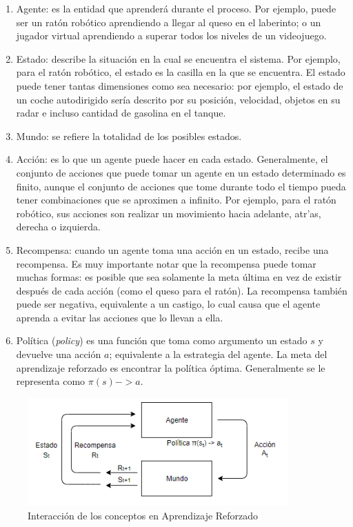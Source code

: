 \begin{enumerate}
    \item Agente: es la entidad que aprender\'a durante el proceso. Por ejemplo, puede ser un rat\'on rob\'otico aprendiendo a llegar al queso en el laberinto; o un jugador virtual aprendiendo a superar todos los niveles de un videojuego.
    \item Estado: describe la situaci\'on en la cual se encuentra el sistema. Por ejemplo, para el rat\'on rob\'otico, el estado es la casilla en la que se encuentra. El estado puede tener tantas dimensiones como sea necesario: por ejemplo, el estado de un coche autodirigido ser\'ia descrito por su posici\'on, velocidad, objetos en su radar e incluso cantidad de gasolina en el tanque.
    \item Mundo: se refiere la totalidad de los posibles estados.
    \item Acci\'on: es lo que un agente puede hacer en cada estado. Generalmente, el conjunto de acciones que puede tomar un agente en un estado determinado es finito, aunque el conjunto de acciones que tome durante todo el tiempo pueda tener combinaciones que se aproximen a infinito. Por ejemplo, para el rat\'on rob\'otico, sus acciones son realizar un movimiento hacia adelante, atr'as, derecha o izquierda.
    \item Recompensa: cuando un agente toma una acci\'on en un estado, recibe una recompensa. Es muy importante notar que la recompensa puede tomar muchas formas: es posible que sea solamente la meta \'ultima en vez de existir despu\'es de cada acci\'on (como el queso para el rat\'on). La recompensa tambi\'en puede ser negativa, equivalente a un castigo, lo cual causa que el agente aprenda a evitar las acciones que lo llevan a ella.
    \item Pol\'itica (\textit{policy}) es una funci\'on que toma como argumento un estado $s$ y devuelve una acci\'on $a$; equivalente a la estrategia del agente. La meta del aprendizaje reforzado es encontrar la pol\'itica \'optima. Generalmente se le representa como $\pi(s)->a$.
\end{enumerate}

\begin{figure}[ht]
\caption{Interacci\'on de los conceptos en Aprendizaje Reforzado}
\label{rl_concepts}
\includegraphics[width=10cm]{tesis_tex/figs/rl_concepts.PNG}
\centering
\end{figure}


